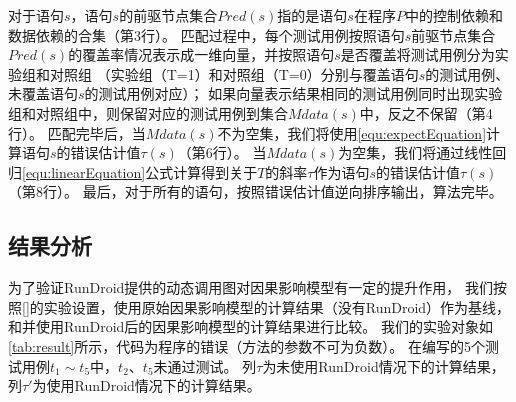 对于语句$s$，语句$s$的前驱节点集合$Pred(s)$指的是语句$s$在程序$P$中的控制依赖和数据依赖的合集（第3行）。
匹配过程中，每个测试用例按照语句$s$前驱节点集合$Pred(s)$的覆盖率情况表示成一维向量，并按照语句$s$是否覆盖将测试用例分为实验组和对照组
（实验组（T=1）和对照组（T=0）分别与覆盖语句$s$的测试用例、未覆盖语句$s$的测试用例对应）；
如果向量表示结果相同的测试用例同时出现实验组和对照组中，则保留对应的测试用例到集合$Mdata(s)$中，反之不保留（第4行）。
匹配完毕后，当$Mdata(s)$不为空集，我们将使用\autoref{equ:expectEquation}计算语句$s$的错误估计值$\tau(s)$（第6行）。
当$Mdata(s)$为空集，我们将通过线性回归\autoref{equ:linearEquation}公式计算得到关于$T$的斜率$\tau$作为语句$s$的错误估计值$\tau(s)$（第8行）。
最后，对于所有的语句，按照错误估计值逆向排序输出，算法完毕。



\subsection{结果分析}


为了验证RunDroid提供的动态调用图对因果影响模型有一定的提升作用，
我们按照[]的实验设置，使用原始因果影响模型的计算结果（没有RunDroid）作为基线，和并使用RunDroid后的因果影响模型的计算结果进行比较。
我们的实验对象如\autoref{tab:result}所示，代码为程序的错误（方法的参数不可为负数）。
在编写的5个测试用例$t_1\sim t_5$中，$t_2$、$ t_5$未通过测试。
列$\tau$为未使用RunDroid情况下的计算结果，列$\tau'$为使用RunDroid情况下的计算结果。

